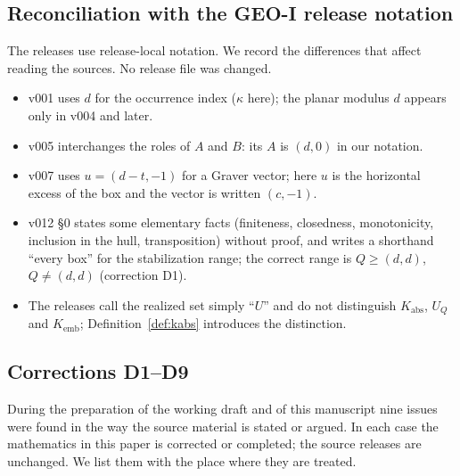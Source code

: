 \subsection{Reconciliation with the GEO-I release notation}

The releases use release-local notation. We record the differences that affect reading the sources. No release file was changed.

\begin{itemize}
\item v001 uses $d$ for the occurrence index ($\kappa$ here); the planar modulus $d$ appears only in v004 and later.
\item v005 interchanges the roles of $A$ and $B$: its $A$ is $(d,0)$ in our notation.
\item v007 uses $u=(d-t,-1)$ for a Graver vector; here $u$ is the horizontal excess of the box and the vector is written $(c,-1)$.
\item v012 \S0 states some elementary facts (finiteness, closedness, monotonicity, inclusion in the hull, transposition) without proof, and writes a shorthand ``every box'' for the stabilization range; the correct range is $Q\ge(d,d)$, $Q\ne(d,d)$ (correction D1).
\item The releases call the realized set simply ``$U$'' and do not distinguish $K_{\mathrm{abs}}$, $U_Q$ and $K_{\mathrm{emb}}$; Definition~\ref{def:kabs} introduces the distinction.
\end{itemize}

\subsection{Corrections D1--D9}\label{app:corrections}

During the preparation of the working draft and of this manuscript nine issues were found in the way the source material is stated or argued. In each case the mathematics in this paper is corrected or completed; the source releases are unchanged. We list them with the place where they are treated.

